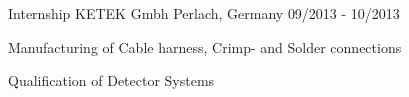 \begin{cventries}
  \cventry
    {Internship} %
    {KETEK Gmbh} %
    {Perlach, Germany} %
    {09/2013 - 10/2013} %
    {
      \begin{cvitems} %
        \item { Manufacturing of  Cable harness, Crimp- and Solder connections}
        \item { Qualification of Detector Systems }
      \end{cvitems}
    }

\end{cventries}
